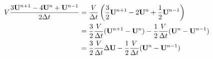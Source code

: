 \documentclass{article}
\begin{document}
\begin{equation}
    \begin{aligned}
        V\frac{3\mathbf{U}^{n+1}-4\mathbf{U}^n+\mathbf{U}^{n-1}}{2\Delta t}
        &=
        \frac{V}{\Delta t}
        \left(
            \frac{3}{2}\mathbf{U}^{n+1}-2\mathbf{U}^n+\frac{1}{2}\mathbf{U}^{n-1}
        \right)
        \\
        &=
        \frac{3}{2}\frac{V}{\Delta t}(\mathbf{U}^{n+1}-\mathbf{U}^n)
        -
        \frac{1}{2}\frac{V}{\Delta t}(\mathbf{U}^{n} - \mathbf{U}^{n-1})
        \\
        &=
        \frac{3}{2}\frac{V}{\Delta t}\Delta\mathbf{U}
        -
        \frac{1}{2}\frac{V}{\Delta t}(\mathbf{U}^{n} - \mathbf{U}^{n-1})
    \end{aligned}
\end{equation}
\end{document}
